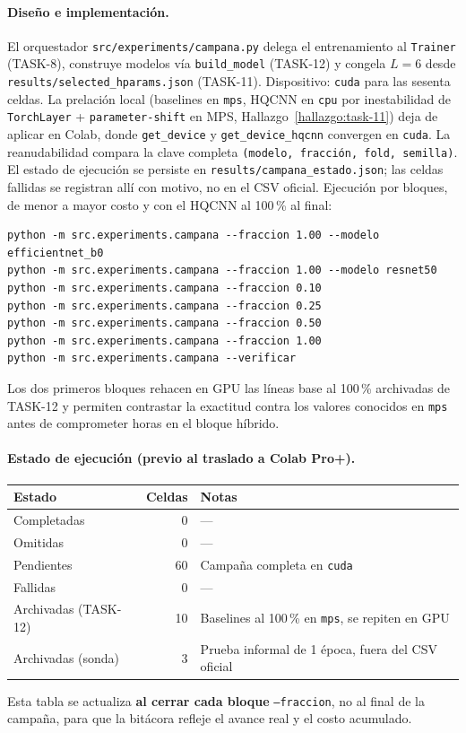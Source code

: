 \paragraph{Diseño e implementación.}
El orquestador \texttt{src/experiments/campana.py} delega el entrenamiento al \texttt{Trainer}
(TASK-8), construye modelos vía \texttt{build\_model} (TASK-12) y congela
$L = 6$ desde \texttt{results/selected\_hparams.json} (TASK-11).
Dispositivo: \texttt{cuda} para las sesenta celdas. La prelación local
(baselines en \texttt{mps}, HQCNN en \texttt{cpu} por inestabilidad de \texttt{TorchLayer} +
\texttt{parameter-shift} en MPS, Hallazgo~\ref{hallazgo:task-11}) deja de aplicar en Colab,
donde \texttt{get\_device} y \texttt{get\_device\_hqcnn} convergen en \texttt{cuda}.
La reanudabilidad compara la clave completa \texttt{(modelo, fracción, fold, semilla)}.
El estado de ejecución se persiste en \texttt{results/campana\_estado.json}; las celdas
fallidas se registran allí con motivo, no en el CSV oficial.
Ejecución por bloques, de menor a mayor costo y con el HQCNN al 100\,\% al final:
\begin{verbatim}
python -m src.experiments.campana --fraccion 1.00 --modelo efficientnet_b0
python -m src.experiments.campana --fraccion 1.00 --modelo resnet50
python -m src.experiments.campana --fraccion 0.10
python -m src.experiments.campana --fraccion 0.25
python -m src.experiments.campana --fraccion 0.50
python -m src.experiments.campana --fraccion 1.00
python -m src.experiments.campana --verificar
\end{verbatim}
Los dos primeros bloques rehacen en GPU las líneas base al 100\,\% archivadas de TASK-12 y
permiten contrastar la exactitud contra los valores conocidos en \texttt{mps} antes de
comprometer horas en el bloque híbrido.

\paragraph{Estado de ejecución (previo al traslado a Colab Pro+).}
\begin{center}
\small
\begin{tabular}{lrl}\hline
\textbf{Estado} & \textbf{Celdas} & \textbf{Notas} \\\hline
Completadas & 0 & --- \\
Omitidas & 0 & --- \\
Pendientes & 60 & Campaña completa en \texttt{cuda} \\
Fallidas & 0 & --- \\
Archivadas (TASK-12) & 10 & Baselines al 100\,\% en \texttt{mps}, se repiten en GPU \\
Archivadas (sonda) & 3 & Prueba informal de 1 época, fuera del CSV oficial \\\hline
\end{tabular}
\end{center}
Esta tabla se actualiza \textbf{al cerrar cada bloque} \texttt{--fraccion}, no al final de la
campaña, para que la bitácora refleje el avance real y el costo acumulado.

